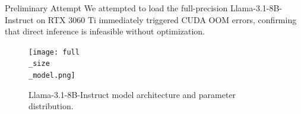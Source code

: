 \documentclass[final]{beamer}
\newlength{\colwidth}
\begin{document}
\begin{frame}[t]
\begin{columns}[t]
 \begin{column}{\colwidth}
  \begin{block}{Preliminary Attempt}
    We attempted to load the full-precision Llama-3.1-8B-Instruct on RTX 3060 Ti immediately triggered CUDA OOM errors, confirming that direct inference is infeasible without optimization.
    \begin{figure}
      \centering
      \texttt{[image: full\\\_size\\\_model.png]}
      \caption{Llama-3.1-8B-Instruct model architecture and parameter distribution.}
      \label{fig:model}
    \end{figure}
  \end{block}
  \vspace{-1em}


\end{column}
\end{columns}
\end{frame}
\end{document}
